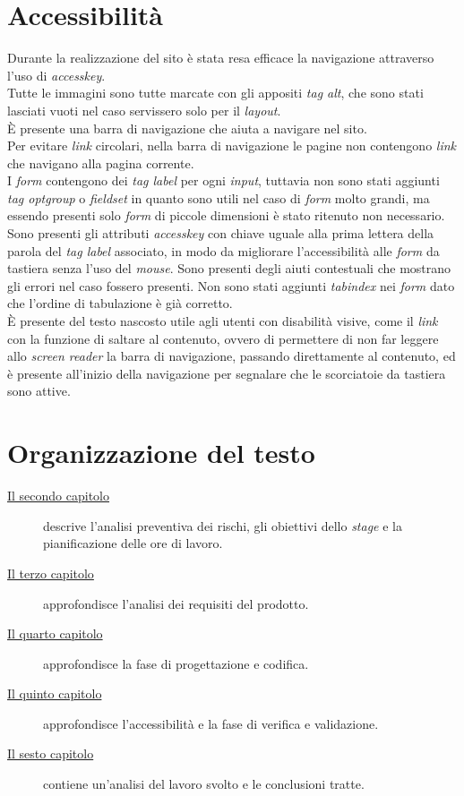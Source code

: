 \section{Accessibilità}
Durante la realizzazione del sito è stata resa efficace la navigazione  attraverso l'uso di \textit{accesskey}.\\
Tutte le immagini sono tutte marcate con gli appositi \textit{tag alt}, che sono stati lasciati vuoti nel caso servissero solo per il \textit{layout}.\\
È presente una barra di navigazione che aiuta a navigare nel sito.\\ 
Per evitare \textit{link} circolari, nella barra di navigazione le pagine non contengono \textit{link} che navigano alla pagina corrente.\\
I \textit{form} contengono dei \textit{tag label} per ogni \textit{input}, tuttavia non sono stati aggiunti \textit{tag optgroup} o \textit{fieldset} in quanto sono utili nel caso di \textit{form} molto grandi, ma essendo presenti solo \textit{form} di piccole dimensioni è stato ritenuto non necessario.\\ 
Sono presenti gli attributi \textit{accesskey} con chiave uguale alla prima lettera della parola del \textit{tag label} associato, in modo da migliorare l'accessibilità alle \textit{form} da tastiera senza l'uso del \textit{mouse}. 
Sono presenti degli aiuti contestuali che mostrano gli errori nel caso fossero presenti. Non sono stati aggiunti \textit{tabindex} nei \textit{form} dato che l'ordine di tabulazione è già corretto.\\
È presente del testo nascosto utile agli utenti con disabilità visive, come il \textit{link} con la funzione  di saltare al contenuto, ovvero di permettere di non far leggere allo \textit{screen reader} la barra di navigazione, passando direttamente al contenuto, ed è presente all'inizio della navigazione
 per segnalare che le scorciatoie da tastiera sono attive.
\section{Organizzazione del testo}

\begin{description}    
    \item[{\hyperref[cap:descrizione-stage]{Il secondo capitolo}}] descrive l'analisi preventiva dei rischi, gli obiettivi dello \textit{stage} e
    la pianificazione delle ore di lavoro.
    \item[{\hyperref[cap:analisi-requisiti]{Il terzo capitolo}}] approfondisce l'analisi dei requisiti del prodotto.
    
    \item[{\hyperref[cap:progettazione-codifica]{Il quarto capitolo}}] approfondisce la fase di progettazione e codifica.
    
    \item[{\hyperref[cap:verifica-validazione]{Il quinto capitolo}}] approfondisce l'accessibilità e la fase di verifica e validazione.
    
    \item[{\hyperref[cap:conclusioni]{Il sesto capitolo}}] contiene un’analisi del lavoro svolto e le conclusioni tratte.
\end{description}
